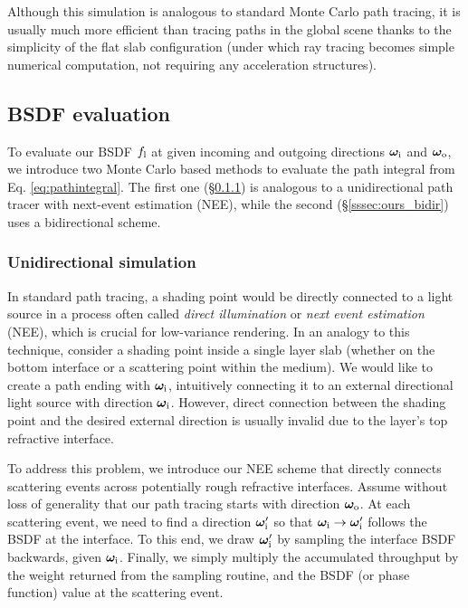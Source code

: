Although this simulation is analogous to standard Monte Carlo path tracing, it is usually much more efficient than tracing paths in the global scene thanks to the simplicity of the flat slab configuration (under which ray tracing becomes simple numerical computation, not requiring any acceleration structures).

\subsection{BSDF evaluation}
\label{subsec:ours_eval}

To evaluate our BSDF $f_\mathrm{l}$ at given incoming and outgoing directions $\bm\omega_\mathrm{i}$ and $\bm\omega_\mathrm{o}$, we introduce two Monte Carlo based methods to evaluate the path integral from Eq. \eqref{eq:pathintegral}.
The first one (\S\ref{sssec:ours_unidir}) is analogous to a unidirectional path tracer with next-event estimation (NEE), while the second (\S\ref{sssec:ours_bidir}) uses a bidirectional scheme.

\subsubsection{Unidirectional simulation}
\label{sssec:ours_unidir}

In standard path tracing, a shading point would be directly connected to a light source in a process often called \emph{direct illumination} or \emph{next event estimation} (NEE), which is crucial for low-variance rendering. In an analogy to this technique, consider a shading point inside a single layer slab (whether on the bottom interface or a scattering point within the medium). We would like to create a path ending with $\bm\omega_\mathrm{i}$, intuitively connecting it to an external directional light source with direction $\bm\omega_\mathrm{i}$. However, direct connection between the shading point and the desired external direction is usually invalid due to the layer's top refractive interface.

To address this problem, we introduce our NEE scheme that directly connects scattering events across potentially rough refractive interfaces.
Assume without loss of generality that our path tracing starts with direction $\bm\omega_\mathrm{o}$.
At each scattering event, we need to find a direction $\bm\omega_\mathrm{i}'$ so that $\bm\omega_\mathrm{i} \to \bm\omega_\mathrm{i}'$ follows the BSDF at the interface.
To this end, we draw $\bm\omega_\mathrm{i}'$ by sampling the interface BSDF backwards, given $\bm\omega_\mathrm{i}$.
Finally, we simply multiply the accumulated throughput by the weight returned from the sampling routine, and the BSDF (or phase function) value at the scattering event.

